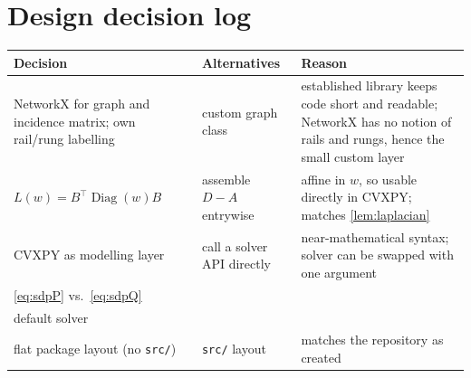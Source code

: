 \documentclass[11pt,a4paper]{article}
\newif\ifdraftnotes
\newcommand{\todo}[1]{\ifdraftnotes{\color{red!70!black}\sffamily[TODO: #1]}\fi}
\theoremstyle{plain}
\theoremstyle{definition}
\theoremstyle{remark}
\newcommand{\code}[1]{\texttt{#1}}
\DeclareMathOperator{\Diag}{Diag}
\begin{document}
	\section{Design decision log}\label{app:decisions}
	\begin{center}
		\small
		\begin{tabular}{@{}p{3.6cm}p{3.6cm}p{7.2cm}@{}}
			\toprule
			Decision & Alternatives & Reason \\
			\midrule
			NetworkX for graph and incidence matrix; own rail/rung labelling
			& custom graph class
			& established library keeps code short and readable; NetworkX has no
			notion of rails and rungs, hence the small custom layer \\
			$L(w)=B^\top\Diag(w)B$
			& assemble $D-A$ entrywise
			& affine in $w$, so usable directly in CVXPY; matches \cref{lem:laplacian} \\
			CVXPY as modelling layer
			& call a solver API directly
			& near-mathematical syntax; solver can be swapped with one argument \\
			\eqref{eq:sdpP} vs.\ \eqref{eq:sdpQ}
			& \todo{} & \todo{} \\
			default solver & \todo{} & \todo{} \\
			flat package layout (no \code{src/})
			& \code{src/} layout & matches the repository as created \todo{expand} \\
			\bottomrule
		\end{tabular}
	\end{center}
	
	
	
	
\end{document}
